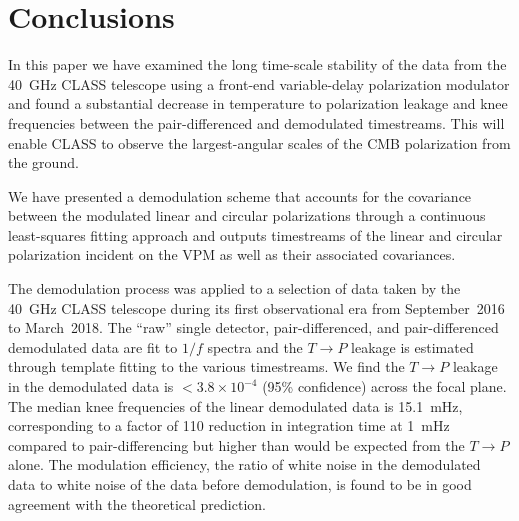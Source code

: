 \documentclass[twocolumn, tighten, numberedappendix, twocolappendix]{aastex63}
\begin{document}
\section{Conclusions} 

In this paper we have examined the long time-scale stability of the data from the 40~GHz CLASS telescope using a front-end variable-delay polarization modulator and found a substantial decrease in temperature to polarization leakage and knee frequencies between the pair-differenced and demodulated timestreams. This will enable CLASS to observe the largest-angular scales of the CMB polarization from the ground. 

We have presented a demodulation scheme that accounts for the covariance between the modulated linear and circular polarizations through a continuous least-squares fitting approach and outputs timestreams of the linear and circular polarization incident on the VPM as well as their associated covariances.

The demodulation process was applied to a selection of data taken by the 40~GHz CLASS telescope during its first observational era from September~2016 to March~2018. The ``raw'' single detector, pair-differenced, and pair-differenced demodulated data are fit to $1/f$ spectra and the $T\rightarrow P$ leakage is estimated through template fitting to the various timestreams. We find the $T\rightarrow P$ leakage in the demodulated data is $<3.8\times 10^{-4}$ (95\% confidence) across the focal plane. The median knee frequencies of the linear demodulated data is 15.1~mHz, corresponding to a factor of 110 reduction in integration time at 1~mHz compared to pair-differencing but higher than would be expected from the $T \rightarrow P$ alone. The modulation efficiency, the ratio of white noise in the demodulated data to white noise of the data before demodulation, is found to be in good agreement with the theoretical prediction.

\end{document}
